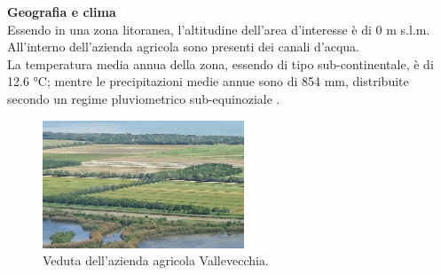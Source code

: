 \textbf{Geografia e clima}\\
Essendo in una zona litoranea, l'altitudine dell'area d'interesse è di 0 m s.l.m.\\ All'interno dell'azienda agricola sono presenti dei canali d'acqua.\\
La temperatura media annua della zona, essendo di tipo sub-continentale, è di 12.6 °C; mentre le precipitazioni medie annue sono di 854 mm, distribuite secondo un regime pluviometrico sub-equinoziale \cite{grassland_in_a_changing_world}.\\
\begin{figure}
\centering
\includegraphics[width=6cm]{immagini/IMG_20190601_123742-2400x1524_c.jpg}
\caption{Veduta dell'azienda agricola Vallevecchia.}
\label{fig:veduta}
\end{figure}
 
